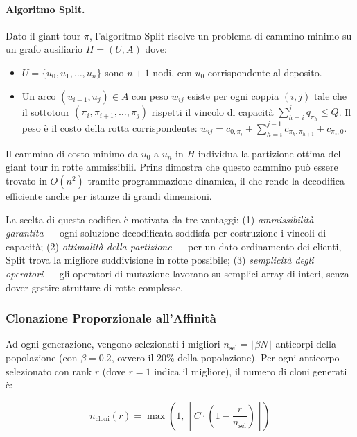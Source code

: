\documentclass[a4paper,12pt]{article}
\begin{document}
\paragraph{Algoritmo Split.} Dato il giant tour $\pi$, l'algoritmo Split risolve un problema di cammino minimo su un grafo ausiliario $H = (U, A)$ dove:
\begin{itemize}
    \item $U = \{u_0, u_1, \dots, u_n\}$ sono $n+1$ nodi, con $u_0$ corrispondente al deposito.
    \item Un arco $(u_{i-1}, u_j) \in A$ con peso $w_{ij}$ esiste per ogni coppia $(i, j)$ tale che il sottotour $(\pi_i, \pi_{i+1}, \dots, \pi_j)$ rispetti il vincolo di capacità $\sum_{h=i}^{j} q_{\pi_h} \leq Q$. Il peso è il costo della rotta corrispondente: $w_{ij} = c_{0,\pi_i} + \sum_{h=i}^{j-1} c_{\pi_h, \pi_{h+1}} + c_{\pi_j, 0}$.
\end{itemize}
Il cammino di costo minimo da $u_0$ a $u_n$ in $H$ individua la partizione ottima del giant tour in rotte ammissibili. Prins dimostra che questo cammino può essere trovato in $O(n^2)$ tramite programmazione dinamica, il che rende la decodifica efficiente anche per istanze di grandi dimensioni.

La scelta di questa codifica è motivata da tre vantaggi: (1) \emph{ammissibilità garantita} --- ogni soluzione decodificata soddisfa per costruzione i vincoli di capacità; (2) \emph{ottimalità della partizione} --- per un dato ordinamento dei clienti, Split trova la migliore suddivisione in rotte possibile; (3) \emph{semplicità degli operatori} --- gli operatori di mutazione lavorano su semplici array di interi, senza dover gestire strutture di rotte complesse.

\subsubsection{Clonazione Proporzionale all'Affinità}

Ad ogni generazione, vengono selezionati i migliori $n_{\text{sel}} = \lfloor \beta N \rfloor$ anticorpi della popolazione (con $\beta = 0.2$, ovvero il 20\% della popolazione). Per ogni anticorpo selezionato con rank $r$ (dove $r = 1$ indica il migliore), il numero di cloni generati è:

\begin{equation}
    n_{\text{cloni}}(r) = \max\!\left(1,\ \left\lfloor C \cdot \left(1 - \frac{r}{n_{\text{sel}}}\right) \right\rfloor\right)
    \label{eq:cloni}
\end{equation}
\end{document}

